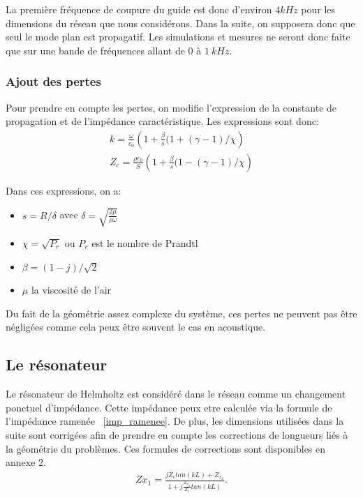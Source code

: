 La première fréquence de coupure du guide est donc d'environ $4kHz$ pour les dimensions du réseau que nous considérons. Dans la suite, on supposera donc que seul le mode plan est propagatif. Les simulations et mesures ne seront donc faite que sur une bande de fréquences allant de $0$ à $1~kHz$.

\subsubsection{Ajout des pertes}

Pour prendre en compte les pertes, on modifie l'expression de la constante de propagation et de l'impédance caractéristique. Les expressions sont donc:
\begin{eqnarray*}
 k =  \frac{\omega}{c_0} \left( 1 + \frac{\beta}{s}(1+(\gamma-1)/ \chi \right) \\
 Z_c =  \frac{\rho c_0}{S} \left( 1 + \frac{\beta}{s}(1-(\gamma-1)/ \chi \right) 
\end{eqnarray*}

Dans ces expressions, on a:
\begin{itemize}
 \item  $s=R/ \delta$ avec $\delta = \sqrt{\frac{2 \mu}{\rho \omega}}$
 \item  $\chi = \sqrt{P_r}$ ou $P_r$ est le nombre de Prandtl
 \item $\beta = (1-j)/\sqrt{2}$ 
 \item $\mu$ la viscosité de l'air
\end{itemize}

Du fait de la géométrie assez complexe du système, ces pertes ne peuvent pas être négligées comme cela peux être souvent le cas en acoustique.

\subsection{Le résonateur}
Le résonateur de Helmholtz est considéré dans le réseau comme un changement ponctuel d'impédance. Cette impédance peux etre calculée via la formule de l'impédance ramenée ~\ref{imp_ramenee}. De plus, les dimensions utilisées dans la suite sont corrigées afin de prendre en compte les corrections de longueurs liés à la géométrie du problèmes. Ces formules de corrections sont disponibles en annexe 2.
\begin{eqnarray}
Z{x_1}=\frac{jZ_c tan(kL)+Z_{x_2}}{1+j\frac{Z_{x_2}}{Z_c}tan(kL)}.
\end{eqnarray}

